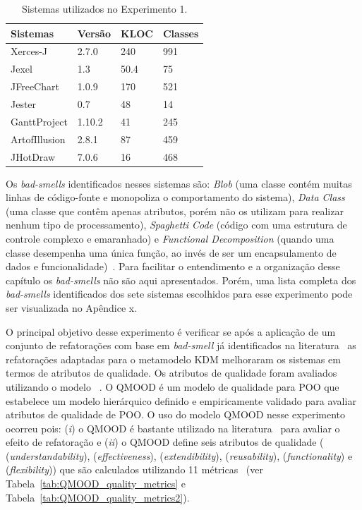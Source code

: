 \begin{table}[h]
\centering
\caption{Sistemas utilizados no Experimento 1.}
\label{tab:sistemas_experimentos}
\begin{tabular}{ | m{2cm} | m{1cm}| m{1cm} | m{1cm} | } 
\hline
Sistemas & Versão & KLOC & Classes \\ 
\hline
Xerces-J & 2.7.0 & 240 & 991\\ 
\hline
Jexel & 1.3 & 50.4 & 75\\
\hline
JFreeChart & 1.0.9 & 170 & 521\\ 
\hline
Jester & 0.7 & 48 & 14\\ 
\hline
GanttProject & 1.10.2 & 41 & 245\\ 
\hline
ArtofIllusion & 2.8.1 & 87 & 459\\ 
\hline
JHotDraw & 7.0.6 & 16 & 468 \\ 
\hline
\end{tabular}
\end{table}

Os \textit{bad-smells} identificados nesses sistemas são: \textit{Blob} (uma classe contém muitas linhas de código-fonte e monopoliza o comportamento do sistema), \textit{Data Class} (uma classe que contêm apenas atributos, porém não os utilizam para realizar nenhum tipo de processamento), \textit{Spaghetti Code} (código com uma estrutura de controle complexo e emaranhado) e \textit{Functional Decomposition} (quando uma classe desempenha uma única função, ao invés de ser um encapsulamento de dados e funcionalidade)~\cite{Fowler1999}. Para facilitar o entendimento e a organização desse capítulo os \textit{bad-smells} não são aqui apresentados. Porém, uma lista completa dos \textit{bad-smells} identificados dos sete sistemas escolhidos para esse experimento pode ser visualizada no Apêndice x.

O principal objetivo desse experimento é verificar se após a aplicação de um conjunto de refatorações com base em \textit{bad-smell} já identificados na literatura~\cite{Kessentini_2011, Ouni_2013, Moha_2010, Kessentini_2010} as refatorações adaptadas para o metamodelo KDM melhoraram os sistemas em termos de atributos de qualidade. Os atributos de qualidade foram avaliados utilizando o modelo ~\cite{Bansiya_QMOOD}. O QMOOD é um modelo de qualidade para POO que estabelece um modelo hierárquico definido e empiricamente validado para avaliar atributos de qualidade de POO. O uso do modelo QMOOD nesse experimento ocorreu pois: (\textit{i}) o QMOOD é bastante utilizado na literatura~\cite{Keeffe_2008, Seng_2006, Jensen_2010} para avaliar o efeito de refatoração e (\textit{ii}) o QMOOD define seis atributos de qualidade ( (\textit{understandability}),  (\textit{effectiveness}),  (\textit{extendibility}),  (\textit{reusability}),  (\textit{functionality}) e  (\textit{flexibility})) que são calculados utilizando 11 métricas~\cite{Bansiya_QMOOD} (ver Tabela~\ref{tab:QMOOD_quality_metrics} e Tabela~\ref{tab:QMOOD_quality_metrics2}). 


